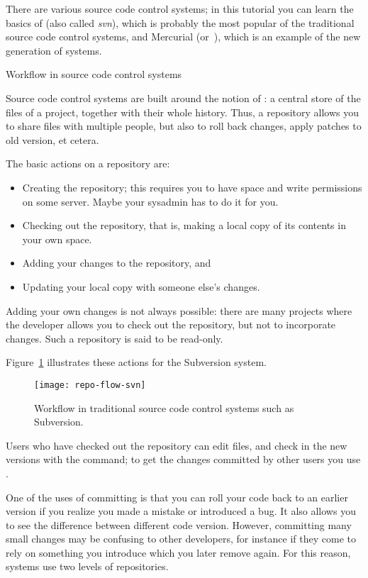 There are various source code control systems; in this tutorial you
can learn the basics of  (also called
\emph{svn}), which is probably the most popular of the traditional
source code control systems, and Mercurial (or~), which is an
example of the new generation of  systems.

 {Workflow in source code control systems}

Source code control systems are built around the notion
of : a central store of the files of a project,
together with their whole history. Thus, a repository allows you to
share files with multiple people, but also to roll back changes, apply
patches to old version, et cetera.

The basic actions on a repository are:
\begin{itemize}
\item Creating the repository; this requires you to have space and
  write permissions on some server. Maybe your sysadmin has to do it
  for you.
\item Checking out the repository, that is, making a local copy of its
  contents in your own space.
\item\label{it:commit} Adding your changes to the repository, and
\item Updating your local copy with someone else's changes.
\end{itemize}
Adding your own changes is not always possible: there are many projects
where the developer allows you to check out the repository, but not to
incorporate changes. Such a repository is said to be read-only.

Figure~\ref{fig:svn} illustrates these actions for the Subversion system.
\begin{figure}[ht]
\texttt{[image: repo-flow-svn]}
\caption{Workflow in traditional source code control systems such as Subversion.}
\label{fig:svn}
\end{figure}
Users who have checked out the repository can edit files, and check in
the new versions with the  command; to get the changes
committed by other users you use .

One of the uses of committing is that you can roll your code back to
an earlier version if you realize you made a mistake or introduced a
bug.
It also allows you to see the difference between different
code version. However, committing many small changes may be confusing
to other developers, for instance if they come to rely on something
you introduce which you later remove again. For this reason,
 systems use two levels
of repositories.

